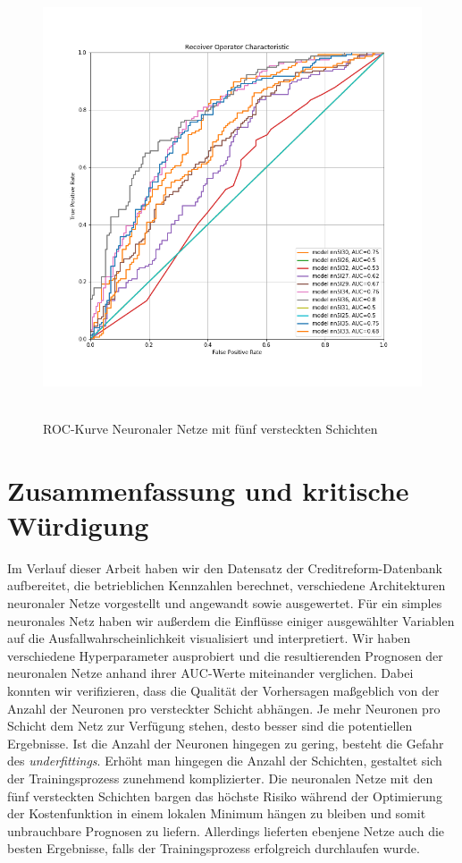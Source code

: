 \documentclass{article}
\begin{document}
\begin{center}
\begin{figure}[ht]
\centering
\caption{ROC-Kurve Neuronaler Netze mit f{\"u}nf versteckten Schichten}
\label{rocNN5L}
\includegraphics[width=15cm, height=13cm]{../rocNN5L.png}
\end{figure}
\end{center}

\section{Zusammenfassung und kritische W{\"u}rdigung}

Im Verlauf dieser Arbeit haben wir den Datensatz der Creditreform-Datenbank aufbereitet, die betrieblichen Kennzahlen berechnet, verschiedene Architekturen neuronaler Netze vorgestellt und angewandt sowie ausgewertet. F{\"u}r ein simples neuronales Netz haben wir au{\ss}erdem die Einfl{\"u}sse einiger ausgew{\"a}hlter Variablen auf die Ausfallwahrscheinlichkeit visualisiert und interpretiert. Wir haben verschiedene Hyperparameter ausprobiert und die resultierenden Prognosen der neuronalen Netze anhand ihrer AUC-Werte miteinander verglichen. Dabei konnten wir verifizieren, dass die Qualit{\"a}t der Vorhersagen ma{\ss}geblich von der Anzahl der Neuronen pro versteckter Schicht abh{\"a}ngen. Je mehr Neuronen pro Schicht dem Netz zur Verf{\"u}gung stehen, desto besser sind die potentiellen Ergebnisse. Ist die Anzahl der Neuronen hingegen zu gering, besteht die Gefahr des \textit{underfittings}. Erh{\"o}ht man hingegen die Anzahl der Schichten, gestaltet sich der Trainingsprozess zunehmend komplizierter. Die neuronalen Netze mit den f{\"u}nf versteckten Schichten bargen das h{\"o}chste Risiko w{\"a}hrend der Optimierung der Kostenfunktion in einem lokalen Minimum h{\"a}ngen zu bleiben und somit unbrauchbare Prognosen zu liefern. Allerdings lieferten ebenjene Netze auch die besten Ergebnisse, falls der Trainingsprozess erfolgreich durchlaufen wurde.
\end{document}
